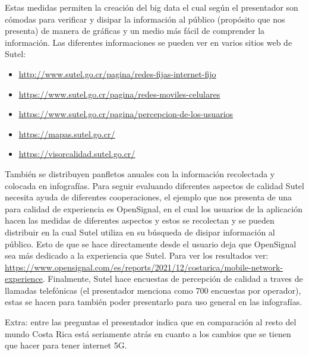 \documentclass[stu, 12pt, letterpaper, donotrepeattitle, floatsintext, natbib, helv]{apa7}
\begin{document}
\quad Estas medidas permiten la creación del big data el cual según el presentador son cómodas para verificar y disipar la información al público (propósito que nos presenta) de manera de gráficas y un medio más fácil de comprender la información. Las diferentes informaciones se pueden ver en varios sitios web de Sutel: 
\begin{itemize}
    \item {\href{http://www.sutel.go.cr/pagina/redes-fijas-internet-fijo}{\underline{http://www.sutel.go.cr/pagina/redes-fijas-internet-fijo}}}{}
    \item {\href{https://www.sutel.go.cr/pagina/redes-moviles-celulares}{\underline{https://www.sutel.go.cr/pagina/redes-moviles-celulares}}}{}
    \item {\href{https://www.sutel.go.cr/pagina/percepcion-de-los-usuarios}{\underline{https://www.sutel.go.cr/pagina/percepcion-de-los-usuarios}}}{}
    \item {\href{https://mapas.sutel.go.cr/}{\underline{https://mapas.sutel.go.cr/}}}{}
    \item {\href{https://visorcalidad.sutel.go.cr/}{\underline{https://visorcalidad.sutel.go.cr/}}}{}
\end{itemize}
También se distribuyen panfletos anuales con la información recolectada y colocada en infografías. Para seguir evaluando diferentes aspectos de calidad Sutel necesita ayuda de diferentes cooperaciones, el ejemplo que nos presenta de una para calidad de experiencia es OpenSignal, en el cual los usuarios de la aplicación hacen las medidas de diferentes aspectos y estos se recolectan y se pueden distribuir en la cual Sutel utiliza en su búsqueda de disipar información al público. Esto de que se hace directamente desde el usuario deja que OpenSignal sea más dedicado a la experiencia que Sutel. Para ver los resultados ver: {\href{https://www.opensignal.com/es/reports/2021/12/costarica/mobile-network-experience}{\underline{https://www.opensignal.com/es/reports/2021/12/costarica/mobile-network-experience}}}{}. Finalmente, Sutel hace encuestas de percepción de calidad a traves de llamadas telefónicas (el presentador menciona como 700 encuestas por operador), estas se hacen para también poder presentarlo para uso general en las infografías.

Extra: entre las preguntas el presentador indica que en comparación al resto del mundo Costa Rica está seriamente atrás en cuanto a los cambios que se tienen que hacer para tener internet 5G.

\end{document}
